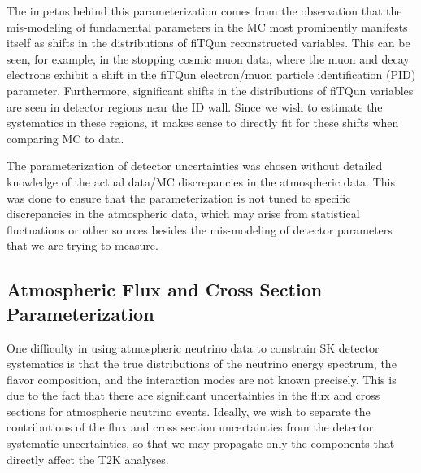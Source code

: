 {The impetus behind this parameterization comes from the observation that the
mis-modeling of fundamental parameters in the MC most prominently manifests
itself as shifts in the distributions of fiTQun reconstructed variables. This
can be seen, for example, in the stopping cosmic muon data, where the muon and
decay electrons exhibit a shift in the fiTQun electron/muon particle
identification (PID) parameter.  Furthermore, significant shifts in the
distributions of fiTQun variables are seen in detector regions near the ID
wall.  Since we wish to estimate the systematics in these regions, it makes
sense to directly fit for these shifts when comparing MC to data. 


The parameterization of detector uncertainties was chosen without detailed
knowledge of the actual data/MC discrepancies in the atmospheric data.  This
was done to ensure that the parameterization is not tuned to specific
discrepancies in the atmospheric data, which may arise from statistical
fluctuations or other sources besides the mis-modeling of detector parameters
that we are trying to measure.  



\subsection{Atmospheric Flux and Cross Section Parameterization}
\label{subsec:alphapar}

One difficulty in using atmospheric neutrino data to constrain SK detector
systematics is that the true distributions of the neutrino energy spectrum, the
flavor composition, and the interaction modes are not known precisely.  This is
due to the fact that there are significant uncertainties in the flux and cross
sections for atmospheric neutrino events.  Ideally, we wish to separate the
contributions of the flux and cross section uncertainties from the detector
systematic uncertainties, so that we may propagate only the components that
directly affect the T2K analyses. 

}
